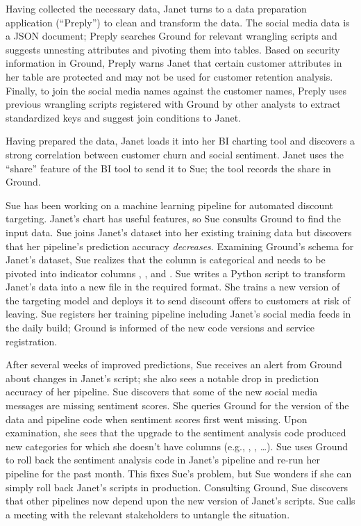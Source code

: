 \documentclass{cidr-2017}
\begin{document}
Having collected the necessary data, Janet turns to a data preparation application (``Preply'') to clean and transform the data. 
The social media data is a JSON document; Preply searches Ground for relevant wrangling scripts and suggests unnesting attributes and pivoting them into tables.
Based on security information in Ground, Preply warns Janet that certain customer attributes in her table are protected and may not be used for customer retention analysis.
Finally, to join the social media names against the customer names, Preply uses previous wrangling scripts registered with Ground by other analysts to extract standardized keys and suggest join conditions to Janet.


Having prepared the data, Janet loads it into her BI charting tool and discovers a strong correlation between customer churn and social sentiment. 
Janet uses the ``share'' feature of the BI tool to send it to Sue; the tool records the share in Ground.


Sue has been working on a machine learning pipeline for automated discount targeting. Janet's chart has useful features, so Sue consults Ground to find the input data.
Sue joins Janet's dataset into her existing training data but discovers that her pipeline's prediction accuracy \emph{decreases}.  
Examining Ground's schema for Janet's dataset, Sue realizes that the  column is categorical and needs to be pivoted into indicator columns , , and . 
Sue writes a Python script to transform Janet's data into a new file in the required format.
She trains a new version of the targeting model and deploys it to send discount offers to customers at risk of leaving.
Sue registers her training pipeline including Janet's social media feeds in the daily build; Ground is informed of the new code versions and service registration.

After several weeks of improved predictions, Sue receives an alert from Ground about changes in Janet's script; she also sees a notable drop in prediction accuracy of her pipeline. 
Sue discovers that some of the new social media messages are missing sentiment scores.
She queries Ground for the version of the data and pipeline code when sentiment scores first went missing.
Upon examination, she sees that the upgrade to the sentiment analysis code produced new categories for which she doesn't have columns (e.g., , , \ldots).
Sue uses Ground to roll back the sentiment analysis code in Janet's pipeline and re-run her pipeline for the past month.  
This fixes Sue's problem, but Sue wonders if she can simply roll back Janet's scripts in production. 
Consulting Ground, Sue discovers that other pipelines now depend upon the new version of Janet's scripts.
Sue calls a meeting with the relevant stakeholders to untangle the situation.
\end{document}
